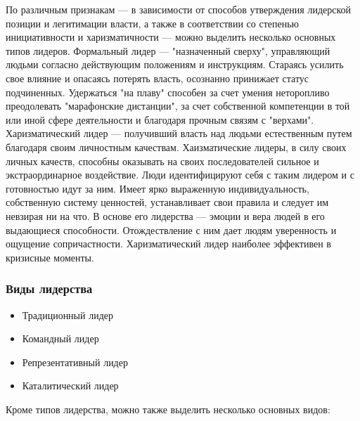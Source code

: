 \documentclass{../industrial-development}
\begin{document}
\lecturenotes

По различным признакам — в зависимости от способов утверждения лидерской позиции и легитимации власти, а также в соответствии со степенью инициативности и харизматичности — можно выделить несколько основных типов лидеров.
Формальный лидер — "назначенный сверху", управляющий людьми согласно действующим положениям и инструкциям. Стараясь усилить свое влияние и опасаясь потерять власть, осознанно принижает статус подчиненных. Удержаться "на плаву" способен за счет умения неторопливо преодолевать "марафонские дистанции", за счет собственной компетенции в той или иной сфере деятельности и благодаря прочным связям с "верхами".
Харизматический лидер — получивший власть над людьми естественным путем благодаря своим личностным качествам.
Хаизматические лидеры, в силу своих личных качеств, спо­собны оказывать на своих последователей сильное и экстраор­динарное воздействие. Люди идентифицируют себя с таким лидером и с готовностью идут за ним. Имеет ярко выраженную индивидуальность, собственную систему ценностей, устанавливает свои правила и следует им невзирая ни на что. В основе его лидерства — эмоции и вера людей в его выдающиеся способности. Отождествление с ним дает людям уверенность и ощущение сопричастности. Харизматический лидер наиболее эффективен в кризисные моменты.

\begin{frame} \frametitle{Виды лидерства}
  \begin{itemize}
  \item Традиционный лидер
  \item Командный лидер
  \item Репрезентативный лидер
  \item Каталитический лидер
  \end{itemize}
\end{frame}

\lecturenotes

Кроме типов лидерства, можно также выделить несколько основных видов:
\end{document}
